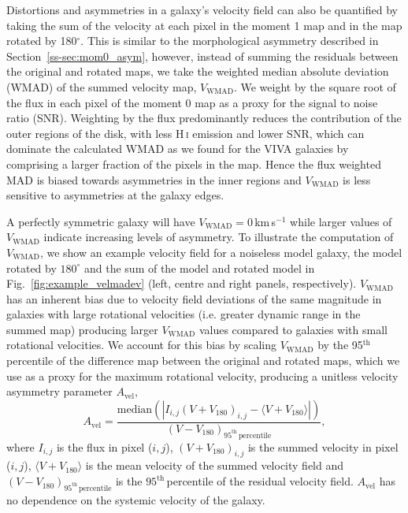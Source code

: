 \documentclass[fleqn,usenatbib]{mnras}
\begin{document}
Distortions and asymmetries in a galaxy's velocity field can also be quantified by taking the sum of the velocity at each pixel in the moment 1 map and in the map rotated by 180$^{\circ}$. This is similar to the morphological asymmetry described in Section~\ref{ss-sec:mom0_asym}, however, instead of summing the residuals between the original and rotated maps, we take the weighted median absolute deviation (WMAD) of the summed velocity map, $V_{\mathrm{WMAD}}$. We weight by the square root of the flux in each pixel of the moment 0 map as a proxy for the signal to noise ratio (SNR). Weighting by the flux predominantly reduces the contribution of the outer regions of the disk, with less H\,\textsc{i} emission and lower SNR, which can dominate the calculated WMAD as we found for the VIVA galaxies by comprising a larger fraction of the pixels in the map. Hence the flux weighted MAD is biased towards asymmetries in the inner regions and $V_{\mathrm{WMAD}}$ is less sensitive to asymmetries at the galaxy edges. 

A perfectly symmetric galaxy will have $V_{\mathrm{WMAD}}=0$\,km\,s$^{-1}$ while larger values of $V_{\mathrm{WMAD}}$ indicate increasing levels of asymmetry. To illustrate the computation of $V_{\mathrm{WMAD}}$, we show an example velocity field for a noiseless model galaxy, the model rotated by $180^{\circ}$ and the sum of the model and rotated model in Fig.~\ref{fig:example_velmadev} (left, centre and right panels, respectively). $V_{\mathrm{WMAD}}$ has an inherent bias due to velocity field deviations of the same magnitude in galaxies with large rotational velocities (i.e. greater dynamic range in the summed map) producing larger $V_{\mathrm{WMAD}}$ values compared to galaxies with small rotational velocities. We account for this bias by scaling $V_{\mathrm{WMAD}}$ by the 95$^{\mathrm{th}}$ percentile of the difference map between the original and rotated maps, which we use as a proxy for the maximum rotational velocity, producing a unitless velocity asymmetry parameter $A_{\mathrm{vel}}$,
\begin{equation}
	\displaystyle A_{\mathrm{vel}}=\frac{\mathrm{median}(|I_{i,j}(V+V_{180})_{i,j}-\langle V+V_{180}\rangle|)}{(V-V_{180})_{95^{\mathrm{th}}\,\mathrm{percentile}}},
	\label{equ:vel_wmad}
\end{equation}
where $I_{i,j}$ is the flux in pixel ($i,j$), $(V+V_{180})_{i,j}$ is the summed velocity in pixel ($i,j$), $\langle V+V_{180}\rangle$ is the mean velocity of the summed velocity field and $(V-V_{180})_{95^{\mathrm{th}}\,\mathrm{percentile}}$ is the $95^{\mathrm{th}}$\,percentile of the residual velocity field. $A_{\mathrm{vel}}$ has no dependence on the systemic velocity of the galaxy.
\end{document}
